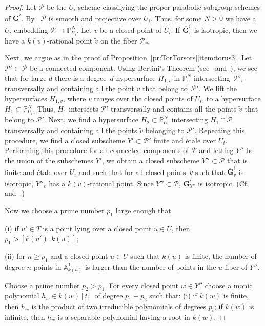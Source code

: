 \documentclass[11pt]{amsart}
\newcommand\A{\mathbb A}
\renewcommand\P{\mathbb P}
\theoremstyle{plain}
\theoremstyle{definition}
\theoremstyle{remark}
\newcommand\cP{{\mathcal{P}}}
\newcommand\bG{{\mathbf G}}
\begin{document}
\begin{proof}
Let $\cP$ be the $U_i$-scheme classifying the proper parabolic subgroup schemes of $\overline{\bG}^i$. By~\cite[exp.~XXVI, cor.~3.6]{SGA3-3} $\cP$ is smooth and projective over $U_i$. Thus, for some $N>0$ we have a $U_i$-embedding $\cP\to\P_{U_i}^N$. Let $v$ be a closed point of $U_i$. If $\overline\bG^i_v$ is isotropic, then we have a $k(v)$-rational point $\widetilde v$ on the fiber $\cP_v$.

Next, we argue as in the proof of Proposition~\ref{pr:TorTorsors}\eqref{item:torus3}. Let $\cP'\subset\cP$ be a connected component. Using Bertini's Theorem (see~\cite{PoonenOnBertini} and~\cite[exp.~XI, thm.~2.1(ii)]{SGA4-3}), we see that for large $d$ there is a degree~$d$ hypersurface $H_{1,v}$ in $\P_v^N$ intersecting~$\cP'_v$ transversally and containing all the point $\widetilde v$ that belong to~$\cP'$. We lift the hypersurfaces $H_{1,v}$, where $v$ ranges over the closed points of $U_i$, to a hypersurface $H_1\subset\P_{U_i}^N$. Thus, $H_1$ intersects $\cP'$ transversally and contains all the points $\tilde v$ that belong to $\cP'$. Next, we find a hypersurface $H_2\subset\P_{U_i}^N$ intersecting $H_1\cap\cP$ transversally and containing all the points $\tilde v$ belonging to $\cP'$. Repeating this procedure, we find a closed subscheme $Y'\subset\cP'$ finite and \'etale over $U_i$. Performing this procedure for all connected components of $\cP$ and letting $Y''$ be the union of the subschemes $Y'$, we obtain a closed subscheme $Y''\subset\cP$ that is finite and \'etale over $U_i$ and such that for all closed points~$v$ such that $\overline{\bG}^i_v$ is isotropic, $Y''_v$ has a $k(v)$-rational point. Since $Y''\subset\cP$, $\overline{\bG}^i_{Y''}$ is isotropic. (Cf.~\cite[Prop.~4.1]{FedorovPanin} and~\cite[Lm.~4.3]{PaninNiceTriples}.)

Now we choose a prime number $p_1$ large enough that

    (i) if $u'\in T$ is a point lying over a closed point $u\in U$, then $p_1>[k(u'):k(u)]$;

    (ii) for $n\ge p_1$ and a closed point $u\in U$ such that $k(u)$ is finite, the number of degree $n$ points in $\A^1_{k(u)}$ is larger than the number of points in the $u$-fiber of $Y''$.

Choose a prime number $p_2>p_1$. For every closed point $w\in Y''$ choose a monic polynomial $h_w\in k(w)[t]$ of degree $p_1+p_2$ such that: (i) if $k(w)$ is finite, then $h_w$ is the product of two irreducible polynomials of degrees $p_i$; if $k(w)$ is infinite, then $h_w$ is a separable polynomial having a root in $k(w)$.


\end{proof}
\end{document}
